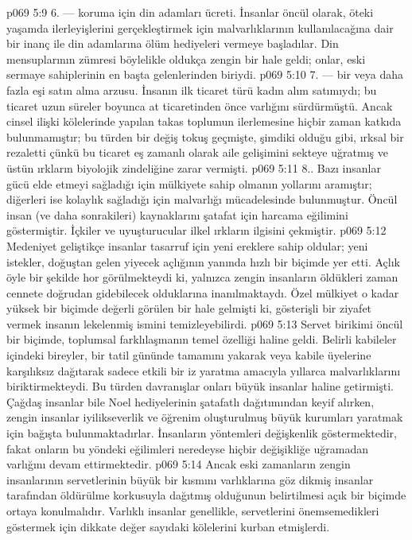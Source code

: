 \vs p069 5:9 6.\bibnobreakspace {} --- koruma için din adamları ücreti. İnsanlar öncül olarak, öteki yaşamda ilerleyişlerini gerçekleştirmek için malvarlıklarının kullanılacağına dair bir inanç ile din adamlarına ölüm hediyeleri vermeye başladılar. Din mensuplarının zümresi böylelikle oldukça zengin bir hale geldi; onlar, eski sermaye sahiplerinin en başta gelenlerinden biriydi.
\vs p069 5:10 7.\bibnobreakspace {} --- bir veya daha fazla eşi satın alma arzusu. İnsanın ilk ticaret türü kadın alım satımıydı; bu ticaret uzun süreler boyunca at ticaretinden önce varlığını sürdürmüştü. Ancak cinsel ilişki kölelerinde yapılan takas toplumun ilerlemesine hiçbir zaman katkıda bulunmamıştır; bu türden bir değiş tokuş geçmişte, şimdiki olduğu gibi, ırksal bir rezaletti çünkü bu ticaret eş zamanlı olarak aile gelişimini sekteye uğratmış ve üstün ırkların biyolojik zindeliğine zarar vermişti.
\vs p069 5:11 8.\bibnobreakspace {}. Bazı insanlar gücü elde etmeyi sağladığı için mülkiyete sahip olmanın yollarını aramıştır; diğerleri ise kolaylık sağladığı için malvarlığı mücadelesinde bulunmuştur. Öncül insan (ve daha sonrakileri) kaynaklarını şatafat için harcama eğilimini göstermiştir. İçkiler ve uyuşturucular ilkel ırkların ilgisini çekmiştir.
\vs p069 5:12 Medeniyet geliştikçe insanlar tasarruf için yeni ereklere sahip oldular; yeni istekler, doğuştan gelen yiyecek açlığının yanında hızlı bir biçimde yer etti. Açlık öyle bir şekilde hor görülmekteydi ki, yalnızca zengin insanların öldükleri zaman cennete doğrudan gidebilecek olduklarına inanılmaktaydı. Özel mülkiyet o kadar yüksek bir biçimde değerli görülen bir hale gelmişti ki, gösterişli bir ziyafet vermek insanın lekelenmiş ismini temizleyebilirdi.
\vs p069 5:13 Servet birikimi öncül bir biçimde, toplumsal farklılaşmanın temel özelliği haline geldi. Belirli kabileler içindeki bireyler, bir tatil gününde tamamını yakarak veya kabile üyelerine karşılıksız dağıtarak sadece etkili bir iz yaratma amacıyla yıllarca malvarlıklarını biriktirmekteydi. Bu türden davranışlar onları büyük insanlar haline getirmişti. Çağdaş insanlar bile Noel hediyelerinin şatafatlı dağıtımından keyif alırken, zengin insanlar iyilikseverlik ve öğrenim oluşturulmuş büyük kurumları yaratmak için bağışta bulunmaktadırlar. İnsanların yöntemleri değişkenlik göstermektedir, fakat onların bu yöndeki eğilimleri neredeyse hiçbir değişikliğe uğramadan varlığını devam ettirmektedir.
\vs p069 5:14 Ancak eski zamanların zengin insanlarının servetlerinin büyük bir kısmını varlıklarına göz dikmiş insanlar tarafından öldürülme korkusuyla dağıtmış olduğunun belirtilmesi açık bir biçimde ortaya konulmalıdır. Varlıklı insanlar genellikle, servetlerini önemsemedikleri göstermek için dikkate değer sayıdaki kölelerini kurban etmişlerdi.
